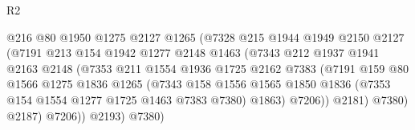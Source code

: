 \begin{lexlean}{R2}
\begin{coremodule}
                                    @216
                                    @80
                                    @1950
                                    @1275
                                    @2127
                                    @1265
                                    (@7328
                                      @215
                                      @1944
                                      @1949
                                      @2150
                                      @2127
                                      (@7191
                                        @213
                                        @154
                                        @1942
                                        @1277
                                        @2148
                                        @1463
                                        (@7343
                                          @212
                                          @1937
                                          @1941
                                          @2163
                                          @2148
                                          (@7353
                                            @211
                                            @1554
                                            @1936
                                            @1725
                                            @2162
                                            @7383
                                            (@7191
                                              @159
                                              @80
                                              @1566
                                              @1275
                                              @1836
                                              @1265
                                              (@7343
                                                @158
                                                @1556
                                                @1565
                                                @1850
                                                @1836
                                                (@7353 @154 @1554 @1277 @1725 @1463 @7383 @7380)
                                                @1863)
                                              @7206))
                                          @2181)
                                        @7380)
                                      @2187)
                                    @7206))
                                @2193)
                              @7380)

\end{coremodule}
\end{lexlean}
